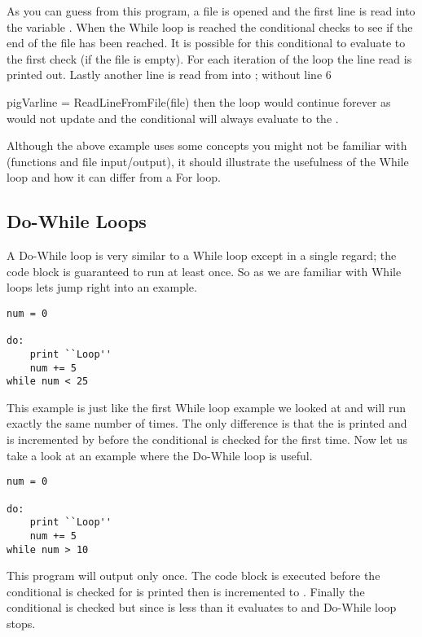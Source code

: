 As you can guess from this program, a file  is opened and the first line is read into the variable .
When the While loop is reached the conditional checks to see if the end of the file has been reached.
It is possible for this conditional to evaluate to  the first check (if the file is empty).
For each iteration of the loop the line read is printed out.
Lastly another line is read from  into ; without line 6 {pigVar{line = ReadLineFromFile(file)} then the loop would continue forever as  would
not update and the conditional will always evaluate to the .
\par

Although the above example uses some concepts you might not be familiar with (functions and file input/output), it should illustrate the usefulness of the While loop and
how it can differ from a For loop.

\subsection{Do-While Loops}

A Do-While loop is very similar to a While loop except in a single regard; the code block is guaranteed to run at least once.
So as we are familiar with While loops lets jump right into an example.

\begin{lstlisting}[caption={Do-While Loop}]
num = 0

do:
    print ``Loop''
    num += 5
while num < 25
\end{lstlisting}

This example is just like the first While loop example we looked at and will run exactly the same number of times.
The only difference is that the  is printed and  is incremented by  before the conditional is checked for the first time.
Now let us take a look at an example where the Do-While loop is useful.

\begin{lstlisting}[caption={Another Do-While Loop}]
num = 0

do:
    print ``Loop''
    num += 5
while num > 10
\end{lstlisting}

This program will output  only once.
The code block is executed before the conditional is checked for  is printed then  is incremented to .
Finally the conditional is checked but since  is less than  it evaluates to  and Do-While loop stops.

}
